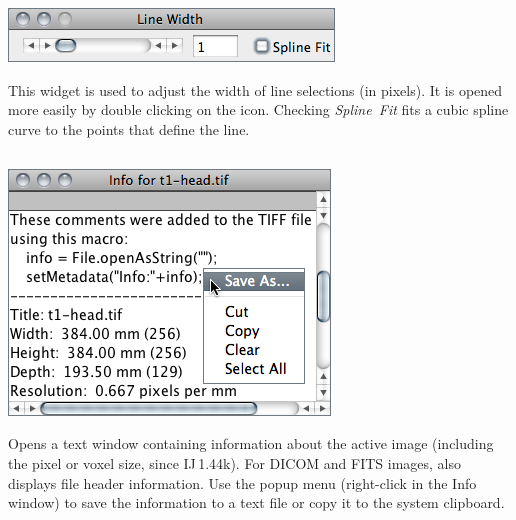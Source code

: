 \begin{minipage}[c][1\totalheight][t]{0.456\columnwidth}%
\includegraphics[scale=0.55]{images/LineWidth2}%
\end{minipage}%
\begin{minipage}[c][1\totalheight][t]{0.544\columnwidth}%
This widget is used to adjust the width of line selections (in pixels).
It is opened more easily by double clicking on the 
icon. Checking \emph{Spline~Fit} fits a cubic spline curve to the
points that define the line.%
\end{minipage}




\subsection[{\protect\userinterface{Show Info\ldots{}\ {[}i{]}}}]{\protect{}\label{sub:Show-Info...}\improvement{}}

\begin{minipage}[c][1\totalheight][t]{0.45\columnwidth}%
\includegraphics[scale=0.55]{images/Info}%
\end{minipage}%
\begin{minipage}[c][1\totalheight][t]{0.55\columnwidth}%
Opens a text window containing information about the active image
(including the pixel or voxel size, since IJ\,1.44k). For DICOM and
FITS images, also displays file header information.
Use the popup menu (right-click in the Info window) to save the information
to a text file or copy it to the system clipboard.


%
\end{minipage}


